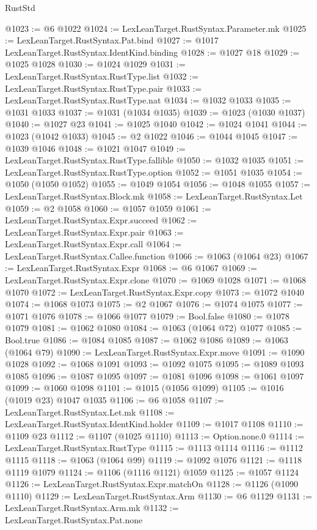 \begin{lexlean}{RustStd}
\begin{coremodule}
@1023 := @6 @1022
@1024 := LexLeanTarget.RustSyntax.Parameter.mk
@1025 := LexLeanTarget.RustSyntax.Pat.bind
@1027 := @1017 LexLeanTarget.RustSyntax.IdentKind.binding
@1028 := @1027 @18
@1029 := @1025 @1028
@1030 := @1024 @1029
@1031 := LexLeanTarget.RustSyntax.RustType.list
@1032 := LexLeanTarget.RustSyntax.RustType.pair
@1033 := LexLeanTarget.RustSyntax.RustType.nat
@1034 := @1032 @1033
@1035 := @1031 @1033
@1037 := @1031 (@1034 @1035)
@1039 := @1023 (@1030 @1037)
@1040 := @1027 @23
@1041 := @1025 @1040
@1042 := @1024 @1041
@1044 := @1023 (@1042 @1033)
@1045 := @2 @1022
@1046 := @1044 @1045
@1047 := @1039 @1046
@1048 := @1021 @1047
@1049 := LexLeanTarget.RustSyntax.RustType.fallible
@1050 := @1032 @1035
@1051 := LexLeanTarget.RustSyntax.RustType.option
@1052 := @1051 @1035
@1054 := @1050 (@1050 @1052)
@1055 := @1049 @1054
@1056 := @1048 @1055
@1057 := LexLeanTarget.RustSyntax.Block.mk
@1058 := LexLeanTarget.RustSyntax.Let
@1059 := @2 @1058
@1060 := @1057 @1059
@1061 := LexLeanTarget.RustSyntax.Expr.succeed
@1062 := LexLeanTarget.RustSyntax.Expr.pair
@1063 := LexLeanTarget.RustSyntax.Expr.call
@1064 := LexLeanTarget.RustSyntax.Callee.function
@1066 := @1063 (@1064 @23)
@1067 := LexLeanTarget.RustSyntax.Expr
@1068 := @6 @1067
@1069 := LexLeanTarget.RustSyntax.Expr.clone
@1070 := @1069 @1028
@1071 := @1068 @1070
@1072 := LexLeanTarget.RustSyntax.Expr.copy
@1073 := @1072 @1040
@1074 := @1068 @1073
@1075 := @2 @1067
@1076 := @1074 @1075
@1077 := @1071 @1076
@1078 := @1066 @1077
@1079 := Bool.false
@1080 := @1078 @1079
@1081 := @1062 @1080
@1084 := @1063 (@1064 @72) @1077
@1085 := Bool.true
@1086 := @1084 @1085
@1087 := @1062 @1086
@1089 := @1063 (@1064 @79)
@1090 := LexLeanTarget.RustSyntax.Expr.move
@1091 := @1090 @1028
@1092 := @1068 @1091
@1093 := @1092 @1075
@1095 := @1089 @1093 @1085
@1096 := @1087 @1095
@1097 := @1081 @1096
@1098 := @1061 @1097
@1099 := @1060 @1098
@1101 := @1015 (@1056 @1099)
@1105 := @1016 (@1019 @23) @1047 @1035
@1106 := @6 @1058
@1107 := LexLeanTarget.RustSyntax.Let.mk
@1108 := LexLeanTarget.RustSyntax.IdentKind.holder
@1109 := @1017 @1108
@1110 := @1109 @23
@1112 := @1107 (@1025 @1110)
@1113 := Option.none.{0}
@1114 := LexLeanTarget.RustSyntax.RustType
@1115 := @1113 @1114
@1116 := @1112 @1115
@1118 := @1063 (@1064 @99)
@1119 := @1092 @1076
@1121 := @1118 @1119 @1079
@1124 := @1106 (@1116 @1121) @1059
@1125 := @1057 @1124
@1126 := LexLeanTarget.RustSyntax.Expr.matchOn
@1128 := @1126 (@1090 @1110)
@1129 := LexLeanTarget.RustSyntax.Arm
@1130 := @6 @1129
@1131 := LexLeanTarget.RustSyntax.Arm.mk
@1132 := LexLeanTarget.RustSyntax.Pat.none

\end{coremodule}
\end{lexlean}
